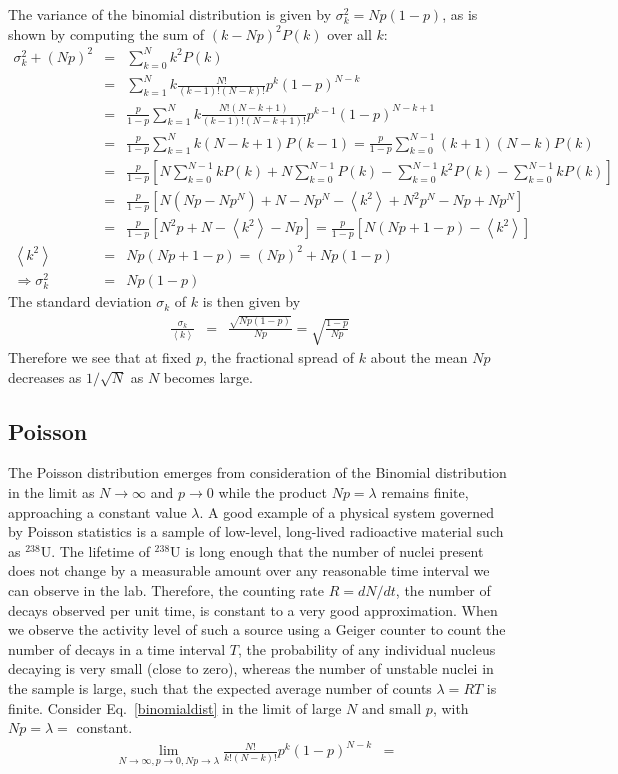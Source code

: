 \documentclass{revtex4}
\begin{document}
The variance of the binomial distribution is given by $\sigma_k^2 =
Np(1-p)$, as is shown by computing the sum of $(k-Np)^2 P(k)$ over all $k$:
\begin{eqnarray}
  \sigma_k^2 + (Np)^2 &=& \sum_{k=0}^N k^2 P(k) \nonumber \\
  &=& \sum_{k=1}^N k \frac{N!}{(k-1)! (N-k)!} p^k(1-p)^{N-k} \nonumber
  \\
  &=& \frac{p}{1-p}\sum_{k=1}^N k\frac{N! (N-k+1)}{(k-1)!(N-k+1)!}
  p^{k-1}(1-p)^{N-k+1} \nonumber \\
  &=& \frac{p}{1-p} \sum_{k=1}^N k (N-k+1) P(k-1) =
  \frac{p}{1-p}\sum_{k=0}^{N-1} (k+1)(N-k) P(k) \nonumber \\
  &=& \frac{p}{1-p} \left[N \sum_{k=0}^{N-1} kP(k) + N
    \sum_{k=0}^{N-1} P(k) - \sum_{k=0}^{N-1} k^2 P(k) -
    \sum_{k=0}^{N-1} k P(k) \right] \nonumber \\
  &=& \frac{p}{1-p} \left[N( Np - Np^N) + N - Np^N - \left<k^2\right>
    + N^2 p^N - Np + Np^N \right] \nonumber \\
  &=& \frac{p}{1-p}\left[N^2 p  + N - \left<k^2\right> - Np  \right] =
  \frac{p}{1-p}\left[N(Np + 1 - p) - \left<k^2\right> \right]
  \nonumber \\
  \left<k^2\right> &=& Np(Np + 1 - p) = (Np)^2 + Np(1-p) \nonumber \\
  \Rightarrow \sigma_k^2 &=& Np(1-p)
\end{eqnarray}
The standard deviation $\sigma_k$ of $k$ is then given by 
\begin{eqnarray}
  \frac{\sigma_k}{\left<k\right>} &=& \frac{\sqrt{Np(1-p)}}{Np} = \sqrt{\frac{1-p}{Np}}
\end{eqnarray} 
Therefore we see that at fixed $p$, the fractional spread of $k$ about
the mean $Np$ decreases as $1/\sqrt{N}$ as $N$ becomes large.
\subsection{Poisson}
The Poisson distribution emerges from consideration of the Binomial
distribution in the limit as $N \rightarrow \infty$ and $p \rightarrow
0$ while the product $Np = \lambda$ remains finite, approaching a
constant value $\lambda$. A good example of a physical system governed
by Poisson statistics is a sample of low-level, long-lived radioactive
material such as $^{238}$U. The lifetime of $^{238}$U is long enough
that the number of nuclei present does not change by a measurable
amount over any reasonable time interval we can observe in the
lab. Therefore, the counting rate $R = dN/dt$, the number of decays
observed per unit time, is constant to a very good approximation.  When we observe the activity level of such
a source using a Geiger counter to count the number of decays in a
time interval $T$, the probability of any individual nucleus decaying
is very small (close to zero), whereas the number of unstable nuclei
in the sample is large, such that the expected average number of counts
$\lambda = RT$ is finite. Consider Eq.~\eqref{binomialdist} in the
limit of large $N$ and small $p$, with $Np = \lambda = $ constant. 
\begin{eqnarray}
  \lim_{N \rightarrow \infty, p \rightarrow 0, Np \rightarrow \lambda}
  \frac{N!}{k!(N-k)!} p^k (1-p)^{N-k} &=& 
\end{eqnarray}
\end{document}
